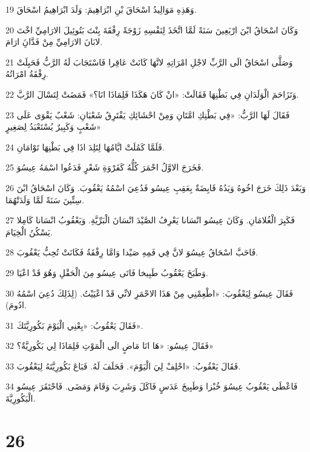 \par 19 وَهَذِهِ مَوَالِيدُ اسْحَاقَ بْنِ ابْرَاهِيمَ: وَلَدَ ابْرَاهِيمُ اسْحَاقَ.
\par 20 وَكَانَ اسْحَاقُ ابْنَ ارْبَعِينَ سَنَةً لَمَّا اتَّخَذَ لِنَفْسِهِ زَوْجَةً رِفْقَةَ بِنْتَ بَتُوئِيلَ الارَامِيِّ اخْتَ لابَانَ الارَامِيِّ مِنْ فَدَّانَِ ارَامَ.
\par 21 وَصَلَّى اسْحَاقُ الَى الرَّبِّ لاجْلِ امْرَاتِهِ لانَّهَا كَانَتْ عَاقِرا فَاسْتَجَابَ لَهُ الرَّبُّ فَحَبِلَتْ رِفْقَةُ امْرَاتُهُ.
\par 22 وَتَزَاحَمَ الْوَلَدَانِ فِي بَطْنِهَا فَقَالَتْ: «انْ كَانَ هَكَذَا فَلِمَاذَا انَا؟» فَمَضَتْ لِتَسْالَ الرَّبَّ.
\par 23 فَقَالَ لَهَا الرَّبُّ: «فِي بَطْنِكِ امَّتَانِ وَمِنْ احْشَائِكِ يَفْتَرِقُ شَعْبَانِ: شَعْبٌ يَقْوَى عَلَى شَعْبٍ وَكَبِيرٌ يُسْتَعْبَدُ لِصَغِيرٍ»
\par 24 فَلَمَّا كَمُلَتْ ايَّامُهَا لِتَلِدَ اذَا فِي بَطْنِهَا تَوْامَانِ.
\par 25 فَخَرَجَ الاوَّلُ احْمَرَ كُلُّهُ كَفَرْوَةِ شَعْرٍ فَدَعُوا اسْمَهُ عِيسُوَ.
\par 26 وَبَعْدَ ذَلِكَ خَرَجَ اخُوهُ وَيَدُهُ قَابِضَةٌ بِعَقِبِ عِيسُو فَدُعِيَ اسْمُهُ يَعْقُوبَ. وَكَانَ اسْحَاقُ ابْنَ سِتِّينَ سَنَةً لَمَّا وَلَدَتْهُمَا.
\par 27 فَكَبِرَ الْغُلامَانِ. وَكَانَ عِيسُو انْسَانا يَعْرِفُ الصَّيْدَ انْسَانَ الْبَرِّيَّةِ. وَيَعْقُوبُ انْسَانا كَامِلا يَسْكُنُ الْخِيَامَ.
\par 28 فَاحَبَّ اسْحَاقُ عِيسُوَ لانَّ فِي فَمِهِ صَيْدا وَامَّا رِفْقَةُ فَكَانَتْ تُحِبُّ يَعْقُوبَ.
\par 29 وَطَبَخَ يَعْقُوبُ طَبِيخا فَاتَى عِيسُو مِنَ الْحَقْلِ وَهُوَ قَدْ اعْيَا.
\par 30 فَقَالَ عِيسُو لِيَعْقُوبَ: «اطْعِمْنِي مِنْ هَذَا الاحْمَرِ لانِّي قَدْ اعْيَيْتُ. (لِذَلِكَ دُعِيَ اسْمُهُ ادُومَ).
\par 31 فَقَالَ يَعْقُوبُ: «بِعْنِي الْيَوْمَ بَكُورِيَّتَكَ».
\par 32 فَقَالَ عِيسُو: «هَا انَا مَاضٍ الَى الْمَوْتِ فَلِمَاذَا لِي بَكُورِيَّةٌ؟»
\par 33 فَقَالَ يَعْقُوبُ: «احْلِفْ لِيَ الْيَوْمَ». فَحَلَفَ لَهُ. فَبَاعَ بَكُورِيَّتَهُ لِيَعْقُوبَ.
\par 34 فَاعْطَى يَعْقُوبُ عِيسُوَ خُبْزا وَطَبِيخَ عَدَسٍ فَاكَلَ وَشَرِبَ وَقَامَ وَمَضَى. فَاحْتَقَرَ عِيسُو الْبَكُورِيَّةَ.

\chapter{26}

